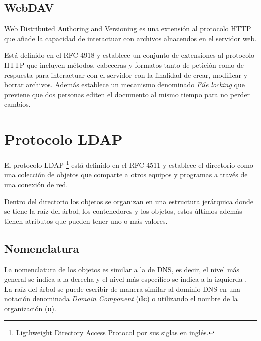   \subsection {WebDAV}

Web Distributed Authoring and Versioning es una extensi\'{o}n al protocolo \textsc{HTTP} que a\~{n}ade la capacidad de interactuar con archivos alnacendos en el servidor web.

Est\'{a} definido en el \textsc{RFC} 4918 \cite{_rfc_????-2} y establece un conjunto de extensiones al protocolo \textsc{HTTP} que incluyen m\'{e}todos, cabeceras y formatos tanto de petici\'{o}n como de respuesta para interactuar con el servidor con la finalidad de crear, modificar y borrar archivos. Adem\'{a}s establece un mecanismo denominado \textit{File locking} que previene que dos personas editen el documento al mismo tiempo para no perder cambios.

\section {Protocolo LDAP}

El protocolo \textsc{LDAP} \footnote{Ligthweight Directory Access Protocol por sus siglas en ingl\'{e}s.} est\'{a} definido en el \textsc{RFC} 4511 \cite{_rfc_????-5} y establece el directorio como una colecci\'{o}n de objetos que comparte a otros equipos y programas a trav\'{e}s de una conexi\'{o}n de red.

Dentro del directorio los objetos se organizan en una estructura jer\'{a}rquica donde se tiene la ra\'{i}z del \'{a}rbol, los contenedores y los objetos, estos \'{u}ltimos adem\'{a}s tienen atributos que pueden tener uno o m\'{a}s valores.

  \subsection {Nomenclatura}

La nomenclatura de los objetos es similar a la de \textsc{DNS}, es decir, el nivel m\'{a}s general se indica a la derecha y el nivel m\'{a}s espec\'{i}fico se indica a la izquierda \cite{_appendix_????}. La ra\'{i}z del \'{a}rbol se puede escribir de manera similar al dominio \textsc{DNS} en una notaci\'{o}n denominada \textit{Domain Component} (\textbf{dc}) o utilizando el nombre de la organizaci\'{o}n (\textbf{o}).

\begin{table}[H]
\caption{Nomenclatura del nodo ra\'{i}z de \textsc{LDAP}}{}
\label{tab:nomenclatura-ldap-root}
\noindent{} %
\end{table}


